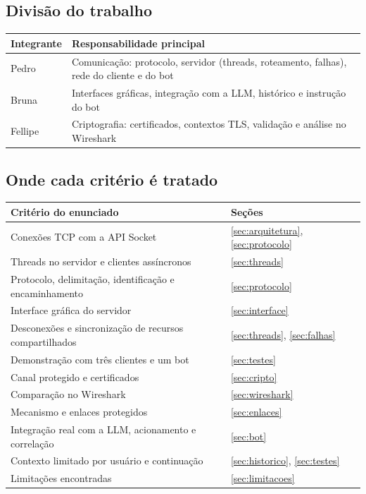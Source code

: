 \documentclass[11pt,a4paper]{article}
\begin{document}
\subsection{Divisão do trabalho}
\begin{center}
\begin{tabularx}{\linewidth}{l X}
\toprule
\textbf{Integrante} & \textbf{Responsabilidade principal} \\
\midrule
Pedro    & Comunicação: protocolo, servidor (threads, roteamento, falhas), rede do cliente e do bot \\
Bruna    & Interfaces gráficas, integração com a LLM, histórico e instrução do bot \\
Fellipe  & Criptografia: certificados, contextos TLS, validação e análise no Wireshark \\
\bottomrule
\end{tabularx}
\end{center}

\subsection{Onde cada critério é tratado}
\begin{center}
\small
\begin{tabularx}{\linewidth}{X l}
\toprule
\textbf{Critério do enunciado} & \textbf{Seções} \\
\midrule
Conexões TCP com a API Socket & \ref{sec:arquitetura}, \ref{sec:protocolo} \\
Threads no servidor e clientes assíncronos & \ref{sec:threads} \\
Protocolo, delimitação, identificação e encaminhamento & \ref{sec:protocolo} \\
Interface gráfica do servidor & \ref{sec:interface} \\
Desconexões e sincronização de recursos compartilhados & \ref{sec:threads}, \ref{sec:falhas} \\
Demonstração com três clientes e um bot & \ref{sec:testes} \\
Canal protegido e certificados & \ref{sec:cripto} \\
Comparação no Wireshark & \ref{sec:wireshark} \\
Mecanismo e enlaces protegidos & \ref{sec:enlaces} \\
Integração real com a LLM, acionamento e correlação & \ref{sec:bot} \\
Contexto limitado por usuário e continuação & \ref{sec:historico}, \ref{sec:testes} \\
Limitações encontradas & \ref{sec:limitacoes} \\
\bottomrule
\end{tabularx}
\end{center}
\end{document}
